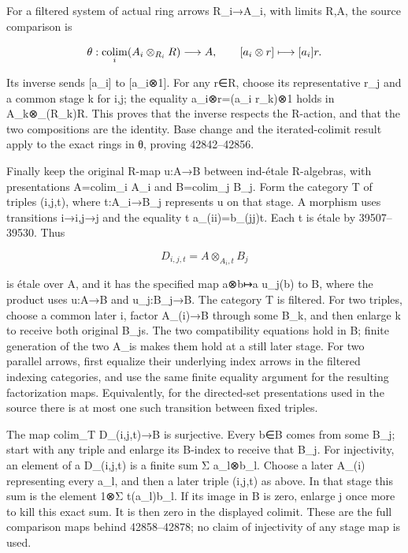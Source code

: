 For a filtered system of actual ring arrows R\_i→A\_i, with limits R,A, the source comparison is

\[
\theta:\mathop{\rm colim}_i(A_i\otimes_{R_i}R)\longrightarrow A,
\qquad [a_i\otimes r]\longmapsto [a_i]r.
\]

Its inverse sends {[}a\_i{]} to {[}a\_i⊗1{]}. For any r∈R, choose its representative r\_j and a common stage k for i,j; the equality a\_i⊗r=(a\_i r\_k)⊗1 holds in A\_k⊗\_(R\_k)R. This proves that the inverse respects the R-action, and that the two compositions are the identity. Base change and the iterated-colimit result apply to the exact rings in θ, proving 42842--42856.

Finally keep the original R-map u:A→B between ind-étale R-algebras, with presentations A=colim\_i A\_i and B=colim\_j B\_j. Form the category T of triples (i,j,t), where t:A\_i→B\_j represents u on that stage. A morphism uses transitions i→i\textquotesingle,j→j\textquotesingle{} and the equality t\textquotesingle{} a\_(ii\textquotesingle)=b\_(jj\textquotesingle)t. Each t is étale by 39507--39530. Thus

\[
D_{i,j,t}=A\otimes_{A_i,t}B_j
\]

is étale over A, and it has the specified map a⊗b↦a u\_j(b) to B, where the product uses u:A→B and u\_j:B\_j→B. The category T is filtered. For two triples, choose a common later i\textquotesingle, factor A\_(i\textquotesingle)→B through some B\_k, and then enlarge k to receive both original B\_j\textquotesingle s. The two compatibility equations hold in B; finite generation of the two A\_i\textquotesingle s makes them hold at a still later stage. For two parallel arrows, first equalize their underlying index arrows in the filtered indexing categories, and use the same finite equality argument for the resulting factorization maps. Equivalently, for the directed-set presentations used in the source there is at most one such transition between fixed triples.

The map colim\_T D\_(i,j,t)→B is surjective. Every b∈B comes from some B\_j; start with any triple and enlarge its B-index to receive that B\_j. For injectivity, an element of a D\_(i,j,t) is a finite sum Σ a\_l⊗b\_l. Choose a later A\_(i\textquotesingle) representing every a\_l, and then a later triple (i\textquotesingle,j\textquotesingle,t\textquotesingle) as above. In that stage this sum is the element 1⊗Σ t\textquotesingle(a\_l)b\_l. If its image in B is zero, enlarge j\textquotesingle{} once more to kill this exact sum. It is then zero in the displayed colimit. These are the full comparison maps behind 42858--42878; no claim of injectivity of any stage map is used.

